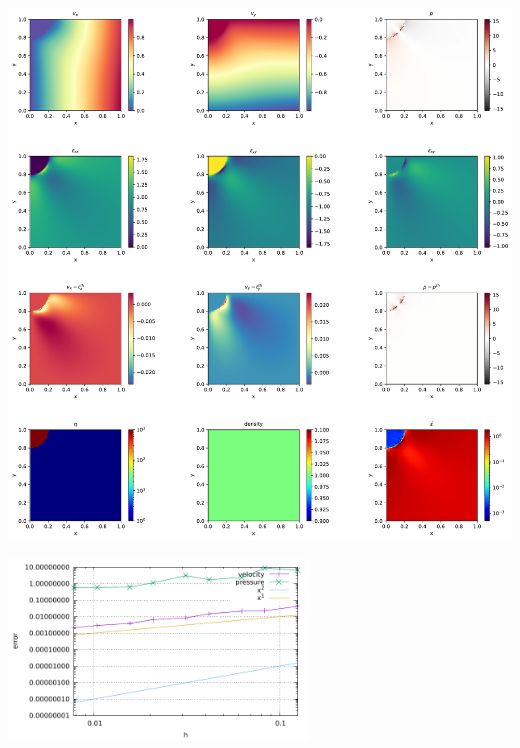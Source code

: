 \includegraphics[width=15cm]{python_codes/fieldstone_07/solution}


\includegraphics[width=8cm]{python_codes/fieldstone_07/errors}
